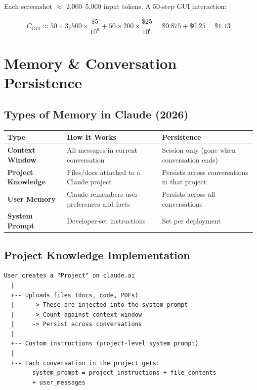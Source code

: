 \documentclass[11pt,a4paper]{article}
\begin{document}
Each screenshot $\approx$ 2,000--5,000 input tokens. A 50-step GUI interaction:

$$C_{\text{GUI}} \approx 50 \times 3{,}500 \times \frac{\$5}{10^6} + 50 \times 200 \times \frac{\$25}{10^6} = \$0.875 + \$0.25 = \$1.13$$

\section{Memory \& Conversation Persistence}

\subsection{Types of Memory in Claude (2026)}

\begin{center}
\begin{tabular}{lL{5cm}L{5cm}}
\toprule
\textbf{Type} & \textbf{How It Works} & \textbf{Persistence} \\
\midrule
\textbf{Context Window} & All messages in current conversation & Session only (gone when conversation ends) \\
\textbf{Project Knowledge} & Files/docs attached to a Claude project & Persists across conversations in that project \\
\textbf{User Memory} & Claude remembers user preferences and facts & Persists across all conversations \\
\textbf{System Prompt} & Developer-set instructions & Set per deployment \\
\bottomrule
\end{tabular}
\end{center}

\subsection{Project Knowledge Implementation}

\begin{lstlisting}[basicstyle=\ttfamily\small, caption={Project Knowledge --- How It Works}]
User creates a "Project" on claude.ai
  |
  +-- Uploads files (docs, code, PDFs)
  |     -> These are injected into the system prompt
  |     -> Count against context window
  |     -> Persist across conversations  
  |
  +-- Custom instructions (project-level system prompt)
  |
  +-- Each conversation in the project gets:
        system_prompt = project_instructions + file_contents
        + user_messages
\end{lstlisting}
\end{document}
